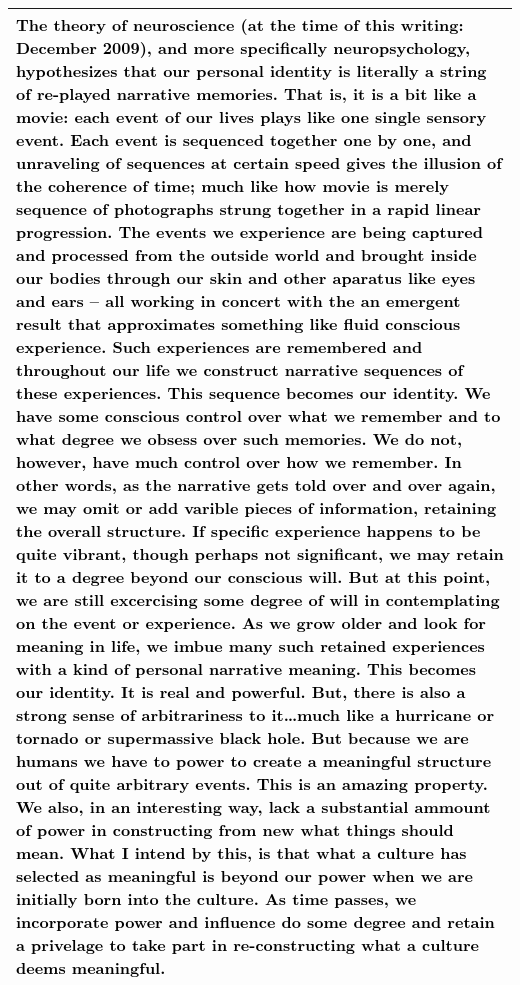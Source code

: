 \textcolor{green}{\begin{tabular}{|p{4in}|}
\hline
      \textcolor{black}{The theory of neuroscience (at the time of this writing: December 2009), and more specifically neuropsychology, hypothesizes that our personal identity is literally a string of re-played narrative memories. That is, it is a bit like a movie: each event of our lives plays like one single sensory event. Each event is sequenced together one by one, and unraveling of sequences at certain speed gives the illusion of the coherence of time; much like how movie is merely sequence of photographs strung together in a rapid linear progression. The events we experience are being captured and processed from the outside world and brought inside our bodies through our skin and other aparatus like eyes and ears -- all working in concert with the an emergent result that approximates something like fluid conscious experience. Such experiences are remembered and throughout our life we construct narrative sequences of these experiences. This sequence becomes our identity. We have some conscious control over what we remember and to what degree we obsess over such memories. We do not, however, have much control over how we remember. In other words, as the narrative gets told over and over again, we may omit or add varible pieces of information, retaining the overall structure. If specific experience happens to be quite vibrant, though perhaps not significant, we may retain it to a degree beyond our conscious will. But at this point, we are still excercising some degree of will in contemplating on the event or experience. As we grow older and look for meaning in life, we imbue many such retained experiences with a kind of personal narrative meaning. This becomes our identity. It is real and powerful. But, there is also a strong sense of arbitrariness to it\ldots much like a hurricane or tornado or supermassive black hole. But because we are humans we have to power to create a meaningful structure out of quite arbitrary events. This is an amazing property. We also, in an interesting way, lack a substantial ammount of power in constructing from new what things should mean. What I intend by this, is that what a culture has selected as meaningful is beyond our power when we are initially born into the culture. As time passes, we incorporate power and influence do some degree and retain a privelage to take part in re-constructing what a culture deems meaningful.}\\
\hline 
\end{tabular}}


